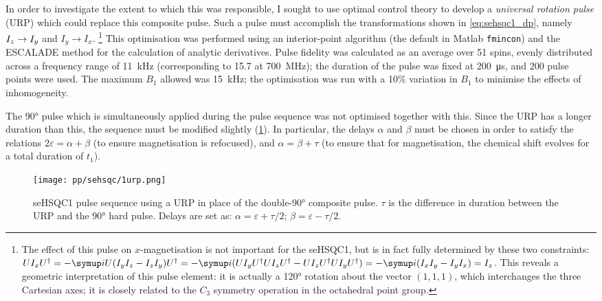 In order to investigate the extent to which this was responsible, I sought to use optimal control theory to develop a \textit{universal rotation pulse} (URP) which could replace this composite pulse.
Such a pulse must accomplish the transformations shown in \cref{eq:sehsqc1_dp}, namely $I_z \to I_y\/$ and $I_y \to I_x$.%
\footnote{The effect of this pulse on $x$-magnetisation is not important for the seHSQC1, but is in fact fully determined by these two constraints: $UI_x\adj{U} = -\mi U(I_yI_z - I_zI_y)\adj{U} = -\mi(UI_y\adj{U}UI_z\adj{U} - UI_z\adj{U}UI_y\adj{U}) = -\mi(I_xI_y - I_yI_x) = I_z$.
This reveals a geometric interpretation of this pulse element: it is actually a \ang{120} rotation about the vector $(1, 1, 1)$, which interchanges the three Cartesian axes; it is closely related to the $C_3$ symmetry operation in the octahedral point group.}
This optimisation was performed using an interior-point algorithm (the default in Matlab \texttt{fmincon}) and the ESCALADE method\autocite{Foroozandeh2021A} for the calculation of analytic derivatives.
Pulse fidelity was calculated as an average over 51 \proton{} spins, evenly distributed across a frequency range of \qty{11}{\kHz} (corresponding to \qty{15.7}{\ppm} at \qty{700}{\MHz}); the duration of the pulse was fixed at \qty{200}{\us}, and 200 pulse points were used.
The maximum $B_1$ allowed was \qty{15}{\kHz}; the optimisation was run with a 10\% variation in $B_1$ to minimise the effects of inhomogeneity.

The \carbon{} \ang{90} pulse which is simultaneously applied during the pulse sequence was not optimised together with this.
Since the \proton{} URP has a longer duration than this, the sequence must be modified slightly (\cref{fig:sehsqc1_urp}).
In particular, the delays $\alpha$ and $\beta$ must be chosen in order to satisfy the relations $2\varepsilon = \alpha + \beta$ (to ensure  magnetisation is refocused), and $\alpha = \beta + \tau$ (to ensure that for  magnetisation, the \carbon{} chemical shift evolves for a total duration of $t_1$).

\begin{figure}[!ht]
    \centering
    \texttt{[image: pp/sehsqc/1urp.png]}%
    \caption[seHSQC1 pulse sequence with \proton{} URP]{
        seHSQC1 pulse sequence using a \proton{} URP in place of the double-\ang{90} composite pulse.
        $\tau$ is the difference in duration between the URP and the \carbon{} \ang{90} hard pulse.
        Delays are set as: $\alpha = \varepsilon + \tau/2$; $\beta = \varepsilon - \tau/2$.
    }
    \label{fig:sehsqc1_urp}
\end{figure}

